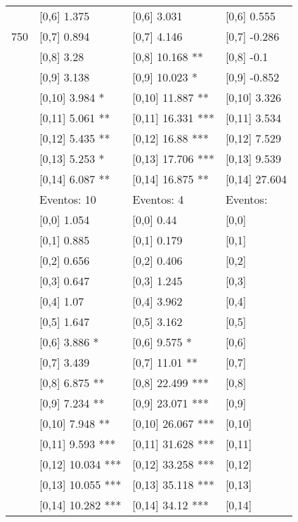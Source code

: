 \begin{table}
\begin{tabular}[t]{llll}
 & {}[0,6] 1.375 & {}[0,6] 3.031 & {}[0,6] 0.555\\
750 & {}[0,7] 0.894 & {}[0,7] 4.146 & {}[0,7] -0.286\\
\addlinespace
 & {}[0,8] 3.28 & {}[0,8] 10.168 ** & {}[0,8] -0.1\\
 & {}[0,9] 3.138 & {}[0,9] 10.023 * & {}[0,9] -0.852\\
 & {}[0,10] 3.984 * & {}[0,10] 11.887 ** & {}[0,10] 3.326\\
 & {}[0,11] 5.061 ** & {}[0,11] 16.331 *** & {}[0,11] 3.534\\
 & {}[0,12] 5.435 ** & {}[0,12] 16.88 *** & {}[0,12] 7.529\\
\addlinespace
 & {}[0,13] 5.253 * & {}[0,13] 17.706 *** & {}[0,13] 9.539\\
 & {}[0,14] 6.087 ** & {}[0,14] 16.875 ** & {}[0,14] 27.604\\
 & Eventos:  10 & Eventos:  4 & Eventos:\\
 & {}[0,0] 1.054 & {}[0,0] 0.44 & {}[0,0]\\
 & {}[0,1] 0.885 & {}[0,1] 0.179 & {}[0,1]\\
\addlinespace
 & {}[0,2] 0.656 & {}[0,2] 0.406 & {}[0,2]\\
 & {}[0,3] 0.647 & {}[0,3] 1.245 & {}[0,3]\\
 & {}[0,4] 1.07 & {}[0,4] 3.962 & {}[0,4]\\
 & {}[0,5] 1.647 & {}[0,5] 3.162 & {}[0,5]\\
 & {}[0,6] 3.886 * & {}[0,6] 9.575 * & {}[0,6]\\
\addlinespace
1000 & {}[0,7] 3.439 & {}[0,7] 11.01 ** & {}[0,7]\\
 & {}[0,8] 6.875 ** & {}[0,8] 22.499 *** & {}[0,8]\\
 & {}[0,9] 7.234 ** & {}[0,9] 23.071 *** & {}[0,9]\\
 & {}[0,10] 7.948 ** & {}[0,10] 26.067 *** & {}[0,10]\\
 & {}[0,11] 9.593 *** & {}[0,11] 31.628 *** & {}[0,11]\\
\addlinespace
 & {}[0,12] 10.034 *** & {}[0,12] 33.258 *** & {}[0,12]\\
 & {}[0,13] 10.055 *** & {}[0,13] 35.118 *** & {}[0,13]\\
 & {}[0,14] 10.282 *** & {}[0,14] 34.12 *** & {}[0,14]\\
\bottomrule
\end{tabular}
\end{table}
